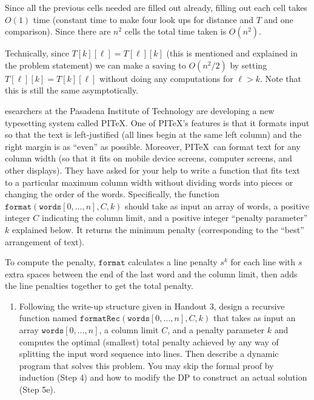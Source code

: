 \documentclass[12 pt, letterpaper]{hmcpset}
\begin{document}
\begin{solution}
\begin{enumerate}
			Since all the previous cells needed are filled out already, filling out each cell takes $O(1)$ time (constant time to make four look ups for distance and $T$ and one comparison). Since there are $n^{2}$ cells the total time taken is $O(n^{2})$. 

			Technically, since $T[k][\ell] = T[\ell][k]$ (this is mentioned and explained in the problem statement) we can make a saving to $O(n^{2} / 2)$ by setting $T[\ell][k] = T[k][\ell]$ without doing any computations for $\ell > k$. Note that this is still the same asymptotically.
	\end{enumerate}
\end{solution}

\begin{problem}
	esearchers at the Pasadena Institute of Technology are developing a new typesetting system called PI\TeX.  One of PI\TeX's features is that it formats input so that the text is  left-justified (all lines begin at the same left column) and the right margin is as ``even'' as possible.  Moreover, PI\TeX\ can
format text for any column width (so that it fits on mobile device screens,
computer screens, and other displays). They have asked for your help to write a function that fits text to a particular maximum column width without dividing words into pieces or changing the order of the words. Specifically, the function $\mathtt{format}(\mathtt{words}[0, \dots, n], C, k)$ should take as input an array of words, a positive integer $C$ indicating the column limit, and a positive integer ``penalty parameter'' $k$ explained below. It returns the minimum penalty (corresponding to the ``best'' arrangement of text).

To compute the penalty, $\mathtt{format}$ calculates a line penalty $s^k$ for each line with $s$ extra spaces between the end of the last word and the column limit, then adds the line penalties together to get the total penalty.

\begin{enumerate}
    \item Following the write-up structure given in Handout 3, design a recursive function named $\mathtt{formatRec}(\mathtt{words}[0, \dots, n], C, k)$ that takes as input an array $\mathtt{words}[0, \dots, n]$, a column limit $C$, and a penalty parameter $k$ and computes the optimal (smallest) total penalty achieved by any way of splitting the input word sequence into lines. Then describe a dynamic program that solves this problem. You may skip the formal proof by induction (Step 4) and how to modify the DP to construct an actual solution (Step 5e).


\end{enumerate}
\end{problem}
\end{document}
